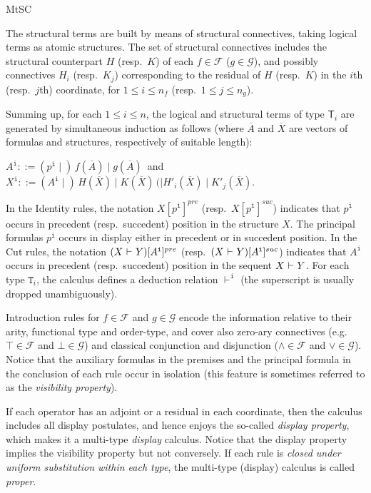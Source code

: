 \begin{entry}{MtSC}
\begin{clarifications}
The structural terms are built by means of structural connectives, taking logical terms as atomic structures. The set of structural connectives includes the structural counterpart $H$ (resp.~$K$) of each $f\in \mathcal{F}$ ($g\in \mathcal{G}$), and possibly connectives $H_i$ (resp.~$K_j$) corresponding to the residual of $H$ (resp.~$K$) in the $i$th (resp.~$j$th) coordinate, for $1\leq i\leq n_f$ (resp.~$1\leq j\leq n_g$).

Summing up, for each $1\leq i\leq n$, the logical and structural terms of type $\mathsf{T}_i$ are generated by simultaneous induction as follows (where $\overline{A}$ and $\overline{X}$ are vectors of formulas and structures, respectively of suitable length): 
\begin{center}
$A^{\texttt{i}} ::= (p^{\texttt{i}} \mid)\, f(\overline{A}) \mid g(\overline{A})\,$ \qquad and \qquad $X^{\texttt{i}} ::= (A^{\texttt{i}} \mid)\, H(\overline{X}) \mid K(\overline{X}) \, (\mid H'_i(\overline{X}) \mid K'_j(\overline{X})$.
\end{center}

In the Identity rules, the notation $X[p^{\texttt{i}}]^{pre}$ (resp.~$X[p^{\texttt{i}}]^{suc}$) indicates that $p^{\texttt{i}}$ occurs in precedent (resp.~succedent) position in the structure $X$. The principal formulas $p^{\texttt{i}}$ occurs in display either in precedent or in succedent position. In the Cut rules, the notation $(X {\mbox{$\ \vdash\ $}} Y)[A^{\texttt{i}}]^{pre}$ (resp.~$(X {\mbox{$\ \vdash\ $}} Y)[A^{\texttt{i}}]^{suc}$) indicates that $A^{\texttt{i}}$ occurs in precedent (resp.~succedent) position in the sequent $X {\mbox{$\ \vdash\ $}} Y$.  For  each type $\texttt{T}_i$, the calculus defines a deduction relation $\vdash^{\texttt{i}}$ (the superscript is usually dropped unambiguously). 

Introduction rules for $f\in\mathcal{F}$ and $g\in\mathcal{G}$ encode the information relative to their arity, functional type and order-type, and cover also zero-ary connectives (e.g.~$\top\in \mathcal{F}$ and $\bot\in \mathcal{G}$) and classical conjunction and disjunction ($\wedge\in \mathcal{F}$ and $\vee\in \mathcal{G}$). Notice that the auxiliary formulas in the premises and the principal formula in the conclusion of each rule occur in isolation (this feature is sometimes referred to as the {\em visibility property}). 

If each operator has an adjoint or a residual in each coordinate, then the calculus includes all display postulates, and hence enjoys the so-called {\em display property}, which makes it a multi-type {\em display} calculus. Notice that the display property implies the visibility property but not conversely. If each rule is {\em closed under uniform substitution within each type}, the multi-type (display) calculus is called {\em proper}. \end{clarifications}



\end{entry}
